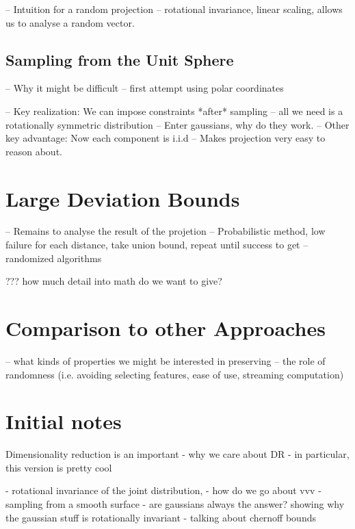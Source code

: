 \documentclass[11pt]{article}
\begin{document}
-- Intuition for a random projection
-- rotational invariance, linear scaling, allows us to analyse a random vector.

\subsection{Sampling from the Unit Sphere}
-- Why it might be difficult
-- first attempt using polar coordinates

-- Key realization: We can impose constraints *after* sampling
   -- all we need is a rotationally symmetric distribution
-- Enter gaussians, why do they work.
-- Other key advantage: Now each component is i.i.d
    -- Makes projection very easy to reason about.

\section{Large Deviation Bounds}
-- Remains to analyse the result of the projetion
-- Probabilistic method, low failure for each distance, take union bound, repeat until success to get
-- randomized algorithms

??? how much detail into math do we want to give?


\section{Comparison to other Approaches}
-- what kinds of properties we might be interested in preserving
-- the role of randomness (i.e. avoiding selecting features, ease of use, streaming computation)


\section{Initial notes}

Dimensionality reduction is an important 
- why we care about DR
- in particular, this version is pretty cool

- rotational invariance of the joint distribution, 
- how do we go about vvv 
- sampling from a smooth surface
- are gaussians always the answer?
showing why the gaussian stuff is rotationally invariant
- talking about chernoff bounds
{}

\end{document}
